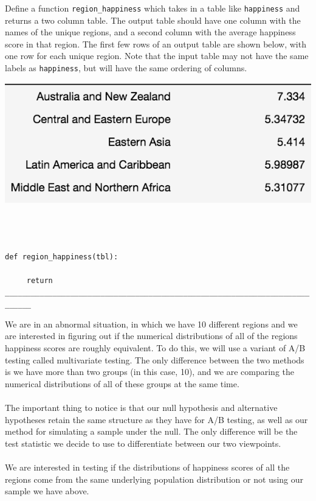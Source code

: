 \begin{enumerate}
 Define a function {\tt region\_happiness} which takes in a table like  {\tt happiness} and returns a two column table. The output table should have one column with the names of the unique regions, and a second column with the average happiness score in that region. The first few rows of an output table are shown below, with one row for each unique region. Note that the input table may not have the same labels as {\tt happiness}, but will have the same ordering of columns.

\begin{center}
\includegraphics[scale=0.9]{regions.png}
\end{center}\\ \\ \\
 
\lstinline{def region_happiness(tbl):}\\ \\
\lstinline{     return ____________________________________________________________________________}
\\

We are in an abnormal situation, in which we have 10 different regions and we are interested in figuring out if the numerical distributions of all of the regions happiness scores are roughly equivalent. To do this, we will use a variant of A/B testing called multivariate testing. The only difference between the two methods is we have more than two groups (in this case, 10), and we are comparing the numerical distributions of all of these groups at the same time. 
\\ \\
The important thing to notice is that our null hypothesis and alternative hypotheses retain the same structure as they have for A/B testing, as well as our method for simulating a sample under the null. The only difference will be the test statistic we decide to use to differentiate between our two viewpoints. 
\\ \\
We are interested in testing if the distributions of happiness scores of all the regions come from the same underlying population distribution or not using our sample we have above.\\


\end{enumerate}
